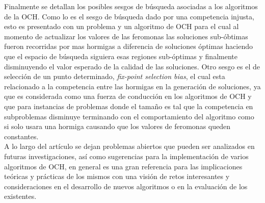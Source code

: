 \documentclass[12pt]{article}
\begin{document}
	Finalmente se detallan los posibles sesgos de búsqueda asociadas a los algoritmos de la OCH. Como lo es el sesgo de búsqueda dado por una competencia injusta, esto es presentado con un problema y un algoritmo de OCH para el cual al momento de actualizar los valores de las feromonas las soluciones sub-óbtimas fueron recorridas por mas hormigas a diferencia de soluciones óptimas haciendo que el espacio de búsqueda siguiera esas regiones sub-óptimas y finalmente disminuyendo el valor esperado de la calidad de las soluciones. Otro sesgo es el de selección de un punto determinado, \textit{fix-point selection bias}, el cual esta relacionado a la competencia entre las hormigas en la generación de soluciones, ya que es considerada como una fuerza de conducción en los algoritmos de OCH y que para instancias de problemas donde el tamaño es tal que la competencia en subproblemas disminuye terminando con el comportamiento del algoritmo como si solo usara una hormiga causando que los valores de feromonas queden constantes.\\
	A lo largo del artículo se dejan problemas abiertos que pueden ser analizados en futuras investigaciones, así como sugerencias para la implementación de varios algoritmos de OCH, en general es una gran referencia para las implicaciones teóricas y prácticas de los mismos con una visión de retos interesantes y consideraciones en el desarrollo de nuevos algoritmos o en la evaluación de los existentes.
 
\end{document}
